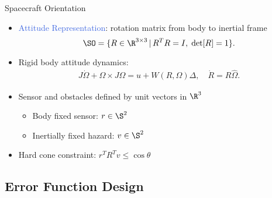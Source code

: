 \documentclass[11pt,professionalfonts]{beamer}
\newcommand{\vs}{\vspace{0.3cm}}
\def\Emph{\textcolor{RoyalBlue}}
\begin{document}
\begin{frame}{Spacecraft Orientation} %

\begin{itemize}

	\item \Emph{Attitude Representation}: rotation matrix from body to inertial frame
	 \[\SO =  \{R\in\R^{3\times 3}\,|\, R^TR=I,\;\mathrm{det}[R]=1\} . \]
	\item Rigid body attitude dynamics:
	\begin{gather*}
		J\dot\Omega + \Omega\times J\Omega = u+W(R,\Omega)\Delta , \quad \dot R = R\hat\Omega .
	\end{gather*}

	\item Sensor and obstacles defined by unit vectors in \( \R^3 \) 
		\begin{itemize}
			\item Body fixed sensor: \( r \in \S^2\)
			\item Inertially fixed hazard: \( v \in \S^2 \)
		\end{itemize} 
	\vs
	\item Hard cone constraint: \( r^T R^T v \leq \cos \theta \)
	
\end{itemize}
\end{frame}   %

  
\subsection*{Error Function Design}
\end{document}

